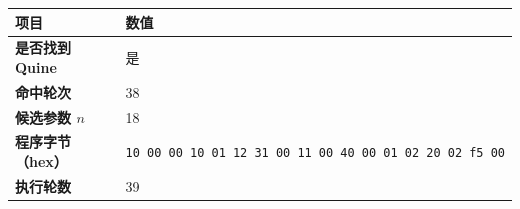 \begin{tabular}{l l}%
\hline%
\textbf{项目}&\textbf{数值}\\%
\hline%
\textbf{是否找到 Quine}&是\\%
\textbf{命中轮次}&38\\%
\textbf{候选参数 $n$}&18\\%
\textbf{程序字节（hex）}&\texttt{10\ 00\ 00\ 10\ 01\ 12\ 31\ 00\ 11\ 00\ 40\ 00\ 01\ 02\ 20\ 02\ f5\ 00}\\%
\textbf{执行轮数}&39\\%
\hline%
\end{tabular}
